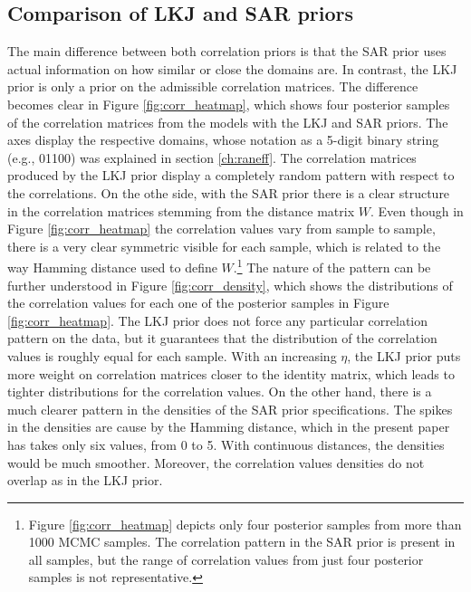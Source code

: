 \subsection{Comparison of LKJ and SAR priors}
\label{ch:comparison_lkj_sar}
The main difference between both correlation priors is that the SAR prior uses actual information on how similar or close the domains are.
In contrast, the LKJ prior is only a prior on the admissible correlation matrices.
The difference becomes clear in Figure \ref{fig:corr_heatmap}, which shows four posterior samples of the correlation matrices from the models with the LKJ and SAR priors.
The axes display the respective domains, whose notation as a 5-digit binary string (e.g., 01100) was explained in section \ref{ch:raneff}.
The correlation matrices produced by the LKJ prior display a completely random pattern with respect to the correlations.
On the othe side, with the SAR prior there is a clear structure in the correlation matrices stemming from the distance matrix $W$.
Even though in Figure \ref{fig:corr_heatmap} the correlation values vary from sample to sample, there is a very clear symmetric visible for each sample, which is related to the way Hamming distance used to define $W$.\footnote{Figure \ref{fig:corr_heatmap} depicts only four posterior samples from more than 1000 MCMC samples. The correlation pattern in the SAR prior is present in all samples, but the range of correlation values from just four posterior samples is not representative.}
The nature of the pattern can be further understood in Figure \ref{fig:corr_density}, which shows the distributions of the correlation values for each one of the posterior samples in Figure \ref{fig:corr_heatmap}.
The LKJ prior does not force any particular correlation pattern on the data, but it guarantees that the distribution of the correlation values is roughly equal for each sample.
With an increasing $\eta$, the LKJ prior puts more weight on correlation matrices closer to the identity matrix, which leads to tighter distributions for the correlation values.
On the other hand, there is a much clearer pattern in the densities of the SAR prior specifications.
The spikes in the densities are cause by the Hamming distance, which in the present paper has takes only six values, from 0 to 5.
With continuous distances, the densities would be much smoother.
Moreover, the correlation values densities do not overlap as in the LKJ prior.

